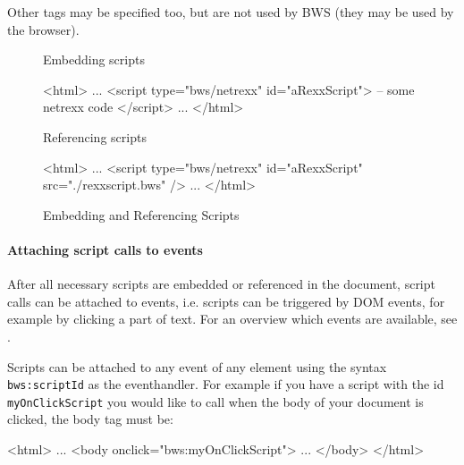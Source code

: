 
Other tags may be specified too, but are not used by BWS (they may be used by the browser).

\begin{figure}[htb]
	\label{fig:EmbeddingAndReferencingScripts}
	Embedding scripts
	\ttfamily 
	\begin{verbatim*}
	<html>
	...
	<script type="bws/netrexx" id="aRexxScript">
	-- some netrexx code
	</script>
	...
	</html>
	\end{verbatim*}
	\rmfamily
	
	Referencing scripts
	
	\ttfamily
	\begin{verbatim*}
	<html>
	...
	<script type="bws/netrexx" id="aRexxScript" src="./rexxscript.bws" />
	...
	</html>
	\end{verbatim*}
	
	\rmfamily
	\caption{Embedding and Referencing Scripts}

\end{figure}

\paragraph{Attaching script calls to events}

After all necessary scripts are embedded or referenced in the document, script calls can be attached to events, i.e. scripts can be triggered by DOM events, for example by clicking a part of text. For an overview which events are available, see \cite{ReferenceDOMEvents}.

Scripts can be attached to any event of any element using the syntax \texttt{bws:scriptId} as the eventhandler. For example if you have a script with the id \texttt{myOnClickScript} you would like to call when the body of your document is clicked, the body tag must be:

\ttfamily

\begin{verbatim*}
<html>
...
<body onclick="bws:myOnClickScript">
...
</body>
</html>
\end{verbatim*}

